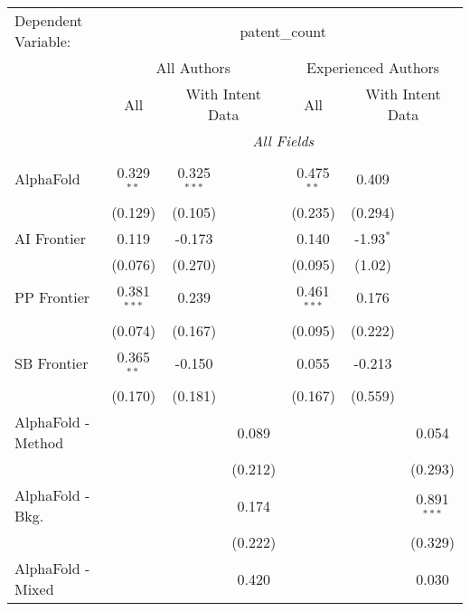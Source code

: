 \begingroup
\centering
\begin{tabular}{lcccccc}
   \tabularnewline \midrule \midrule
   Dependent Variable: & \multicolumn{6}{c}{patent\_count}\\
 & \multicolumn{3}{c}{All Authors} & \multicolumn{3}{c}{Experienced Authors} \\
\cmidrule(lr){2-4} \cmidrule(lr){5-7}
 & \multicolumn{1}{c}{All} & \multicolumn{2}{c}{With Intent Data} & \multicolumn{1}{c}{All} & \multicolumn{2}{c}{With Intent Data} \\
\cmidrule(lr){2-2} \cmidrule(lr){3-4} \cmidrule(lr){5-5} \cmidrule(lr){6-7}
 & \multicolumn{6}{c}{\textit{All Fields}} \\ \\
   AlphaFold            & 0.329$^{**}$  & 0.325$^{***}$ &              & 0.475$^{**}$  & 0.409       &   \\   
                        & (0.129)       & (0.105)       &              & (0.235)       & (0.294)     &   \\   
   AI Frontier          & 0.119         & -0.173        &              & 0.140         & -1.93$^{*}$ &   \\   
                        & (0.076)       & (0.270)       &              & (0.095)       & (1.02)      &   \\   
   PP Frontier          & 0.381$^{***}$ & 0.239         &              & 0.461$^{***}$ & 0.176       &   \\   
                        & (0.074)       & (0.167)       &              & (0.095)       & (0.222)     &   \\   
   SB Frontier          & 0.365$^{**}$  & -0.150        &              & 0.055         & -0.213      &   \\   
                        & (0.170)       & (0.181)       &              & (0.167)       & (0.559)     &   \\   
   AlphaFold - Method   &               &               & 0.089        &               &             & 0.054\\   
                        &               &               & (0.212)      &               &             & (0.293)\\   
   AlphaFold - Bkg.     &               &               & 0.174        &               &             & 0.891$^{***}$\\   
                        &               &               & (0.222)      &               &             & (0.329)\\   
   AlphaFold - Mixed    &               &               & 0.420        &               &             & 0.030\\   

\end{tabular}
